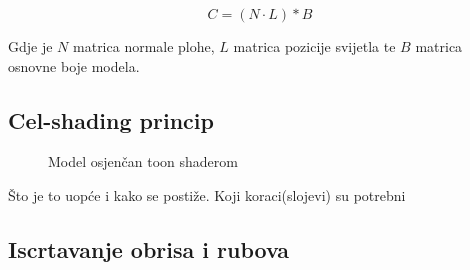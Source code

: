 \begin{equation}
\label{eq:diffuse}
C = (N \cdot L) * B
\end{equation}

Gdje je $N$ matrica normale plohe, $L$ matrica pozicije svijetla te $B$ matrica osnovne boje modela.

\subsection{Cel-shading princip}

\begin{figure}[H]
\label{fig:monkey-toonshaded}
\begin{center}
\caption{Model osjenčan toon shaderom}
\end{center}
\end{figure}

Što je to uopće i kako se postiže. Koji koraci(slojevi) su potrebni

\subsection{Iscrtavanje obrisa i rubova}

